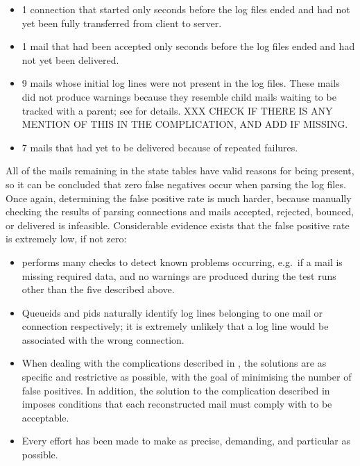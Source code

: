 \begin{itemize}

    \squeezeitems{}

    \item 1 connection that started only seconds before the log files
        ended and had not yet been fully transferred from client to server.

    \item 1 mail that had been accepted only seconds before the log files
        ended and had not yet been delivered.

    \item 9 mails whose initial log lines were not present in the log
        files.  These mails did not produce warnings because they resemble
        child mails waiting to be tracked with a parent; see
         for details.  XXX CHECK IF THERE IS
        ANY MENTION OF THIS IN THE COMPLICATION, AND ADD IF MISSING\@.

    \item 7 mails that had yet to be delivered because of repeated
        failures.

\end{itemize}

All of the mails remaining in the state tables have valid reasons for being
present, so it can be concluded that zero false negatives occur when
parsing the \numberOFlogFILES{} log files.  Once again, determining the
false positive rate is much harder, because manually checking the results
of parsing \numberOFconnectionsINlogFILES{} connections and mails accepted,
rejected, bounced, or delivered is infeasible.  Considerable evidence
exists that the false positive rate is extremely low, if not zero:

\begin{itemize}

    \item \parsername{} performs many checks to detect known problems
        occurring, e.g.\ if a mail is missing required data, and no
        warnings are produced during the test runs other than the five
        described above.

    \item Queueids and \glspl{pid} naturally identify log lines belonging
        to one mail or connection respectively; it is extremely unlikely
        that a log line would be associated with the wrong connection.

    \item When dealing with the complications described in
        , the solutions are as specific and
        restrictive as possible, with the goal of minimising the number of
        false positives.  In addition, the solution to the complication
        described in  imposes conditions
        that each reconstructed mail must comply with to be acceptable.

    \item Every effort has been made to make \parsername{} as precise,
        demanding, and particular as possible.

\end{itemize}

